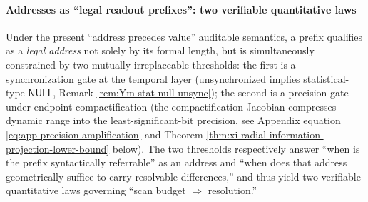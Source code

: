 \paragraph{Addresses as ``legal readout prefixes'': two verifiable quantitative laws}\label{par:xi-legal-readout-prefix-two-laws}
Under the present ``address precedes value'' auditable semantics, a prefix qualifies as a \emph{legal address} not solely by its formal length, but is simultaneously constrained by two mutually irreplaceable thresholds: the first is a synchronization gate at the temporal layer (unsynchronized implies statistical-type \(\mathsf{NULL}\), Remark \ref{rem:Ym-stat-null-unsync}); the second is a precision gate under endpoint compactification (the compactification Jacobian compresses dynamic range into the least-significant-bit precision, see Appendix equation \eqref{eq:app-precision-amplification} and Theorem \ref{thm:xi-radial-information-projection-lower-bound} below).
The two thresholds respectively answer ``when is the prefix syntactically referrable'' as an address and ``when does that address geometrically suffice to carry resolvable differences,'' and thus yield two verifiable quantitative laws governing ``scan budget \(\Rightarrow\) resolution.''
